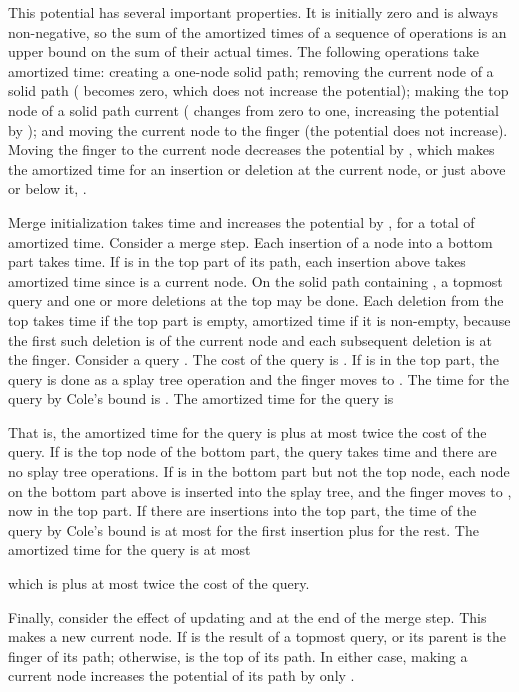 \documentclass[twoside,leqno,twocolumn]{article}
\newcommand{\proofend}{\\}
\begin{document}
This potential has several important properties.  It is initially zero and is always non-negative, so the sum of the amortized times of a sequence of operations is an upper bound on the sum of their actual times. The following operations take  amortized time: creating a one-node solid path; removing the current node of a solid path ( becomes zero, which does not increase the potential); making the top node of a solid path current ( changes from zero to one, increasing the potential by );  and moving the current node to the finger (the potential does not increase).  Moving the finger to the current node decreases the potential by , which makes the amortized time for an insertion or deletion at the current node, or just above or below it, .

Merge initialization takes  time and increases the potential by , for a total of  amortized time.  Consider a merge step.  Each insertion of a node into a bottom part takes  time.  If  is in the top part of its path, each insertion above  takes  amortized time since  is a current node.  On the solid path containing , a topmost query and one or more deletions at the top may be done.  Each deletion from the top takes  time if the top part is empty,   amortized time if it is non-empty, because the first such deletion is of the current node  and each subsequent deletion is at the finger.  Consider  a  query .  The cost of the query is .  If  is in the top part, the query is done as a splay tree operation and the finger moves to . The time for the query by Cole's bound is .  The amortized time for the query is

That is, the amortized time for the query is  plus at most twice the cost of the query.  If  is the top node of the bottom part, the query takes  time and there are no splay tree operations.  If  is in the bottom part but not the top node, each node on the bottom part above  is inserted into the splay tree, and the finger moves to , now in the top part.  If there are  insertions into the top part, the time of the query by Cole's bound is at most  for the first insertion plus  for the rest.
The amortized time for the query is at most

which is  plus at most twice the cost of the query.

Finally, consider the effect of updating  and  at the end of the merge step.  This makes  a new current node.  If  is the result of a topmost query,  or its parent is the finger of its path; otherwise,  is the top of its path.  In either case, making  a current node increases the potential of its path by only .  \proofend
\end{document}
